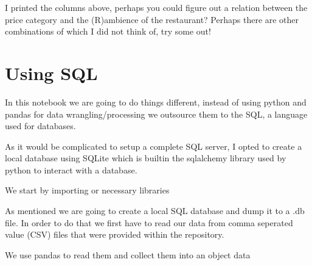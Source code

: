 \documentclass[letterpaper,10pt,english]{jupyterBook}
\begin{document}
\sphinxAtStartPar
I printed the columns above, perhaps you could figure out a relation between the price category and the (R)ambience of the restaurant?
Perhaps there are other combinations of which I did not think of, try some out!


\chapter{Using SQL}
\label{\detokenize{c3_data_preprocessing/sql_integration:using-sql}}\label{\detokenize{c3_data_preprocessing/sql_integration::doc}}
\sphinxAtStartPar
In this notebook we are going to do things different, instead of using python and pandas for data wrangling/processing we outsource them to the SQL, a language used for databases.

\sphinxAtStartPar
As it would be complicated to setup a complete SQL server, I opted to create a local database using SQLite which is built\sphinxhyphen{}in the sqlalchemy library used by python to interact with a database.

\sphinxAtStartPar
We start by importing or necessary libraries

\begin{sphinxVerbatim}[commandchars=\\\{\}]
   
 
\end{sphinxVerbatim}

\sphinxAtStartPar
As mentioned we are going to create a local SQL database and dump it to a .db file. In order to do that we first have to read our data from comma seperated value (CSV) files that were provided within the repository.

\sphinxAtStartPar
We use pandas to read them and collect them into an object data
\end{document}
